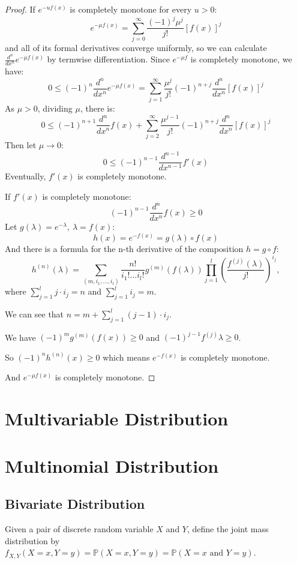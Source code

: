\documentclass[11pt]{article}
\def\BP{{\bf P}}
\def\BP{{\mathbb P}}
\begin{document}
\begin{proof}
If $e^{-uf(x)}$ is completely monotone for every $u>0$:
\[e^{-\mu f(x)} = \sum_{j=0}^{\infty}\frac{(-1)^j\mu^j}{j!}[f(x)]^j\] and all of its formal derivatives converge uniformly, so we can calculate $\frac{d^n}{dx^n}e^{-\mu f(x)}$ by termwise differentiation.
Since $e^{-\mu f}$ is completely monotone, we have:
\[0\le(-1)^n\frac{d^n}{dx^n}e^{-\mu f(x)} = \sum_{j=1}^{\infty}\frac{\mu^j}{j!}(-1)^{n+j}\frac{d^n}{dx^n}[f(x)]^j\]
As $\mu > 0$, dividing $\mu$, there is:
\[0\le(-1)^{n+1}\frac{d^n}{dx^n}f(x)+\sum_{j=2}^{\infty}\frac{\mu^{j-1}}{j!}(-1)^{n+j}\frac{d^n}{dx^n}[f(x)]^j\]
Then let $\mu \rightarrow 0$:
\[0\le(-1)^{n-1}\frac{d^{n-1}}{dx^{n-1}}f'(x)\]
Eventually, $f'(x)$ is completely monotone.

If $f'(x)$ is completely monotone:
\[(-1)^{n-1}\frac{d^n}{dx^n}f(x)\ge0\]
Let $g(\lambda) = e^{-\lambda},~ \lambda = f(x)$:
\[h(x) = e^{- f(x)} = g(\lambda)\circ f(x)\]
And there is a formula for the n-th derivative of the composition $h = g\circ f$:
\[h^{(n)}(\lambda) = \sum_{(m,i_1,...,i_l)}^{}\frac{n!}{i_1!...i_l!}g^{(m)}(f(\lambda))\prod_{j=1}^{l}(\frac{f^{(j)}(\lambda)}{j!})^{i_j},\]
where $\sum_{j=1}^{l}j\cdot i_j = n$ and $\sum_{j=1}^{l}i_j = m$.

We can see that $n = m + \sum_{j=1}^{l}(j-1)\cdot i_j$.

We have $(-1)^mg^{(m)}(f(x)) \ge 0$ and $(-1)^{j-1}f^{(j)}\lambda \ge 0$. 

So $(-1)^nh^{(n)}(x) \ge 0$ which means $e^{-f(x)}$ is completely monotone.

And $e^{-\mu f(x)}$ is completely monotone.


\end{proof}


\section{Multivariable Distribution}
\setcounter{section}{3}
\section{Multinomial Distribution}

\subsection{Bivariate Distribution}
Given a pair of discrete random variable $X$ and $Y$, define the joint mass distribution by $f_{X,Y}(X=x, Y=y) = \BP(X=x, Y=y) = \BP(X=x \text{ and } Y = y)$.
\end{document}
